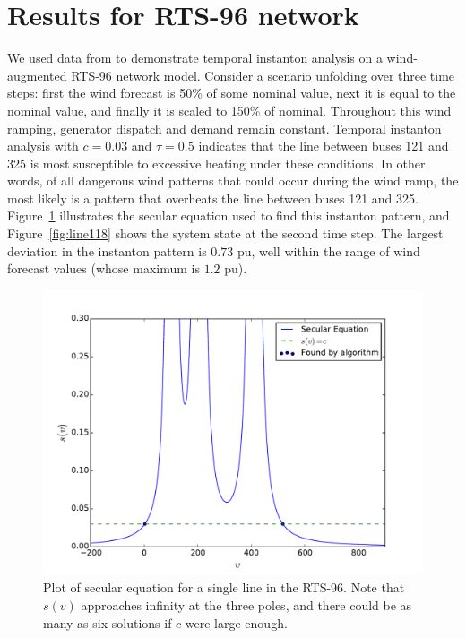 \documentclass[conference]{IEEEtran}
\begin{document}
\section{Results for RTS-96 network}\label{sec:results}

We used data from \cite{pandzic} to demonstrate temporal instanton
analysis on a wind-augmented RTS-96 network model. Consider a scenario
unfolding over three time steps: first the wind forecast is 50\% of
some nominal value, next it is equal to the nominal value, and finally
it is scaled to 150\% of nominal. Throughout this wind ramping,
generator dispatch and demand remain constant. Temporal instanton
analysis with $c=0.03$ and $\tau=0.5$ indicates that the line between
buses 121 and 325 is most susceptible to excessive heating under these
conditions. In other words, of all dangerous wind patterns that could
occur during the wind ramp, the most likely is a pattern that
overheats the line between buses 121 and 325. Figure~\ref{fig:secular}
illustrates the secular equation used to find this instanton pattern,
and Figure~\ref{fig:line118} shows the system state at the second time
step. The largest deviation in the instanton pattern is $0.73$ pu,
well within the range of wind forecast values (whose maximum is $1.2$
pu).


\begin{figure}[t]
\centering
\includegraphics[trim=0in 0in 0.5in 0.5in,clip,width=1\linewidth]{images/secular}
\caption{Plot of secular equation for a single line in the RTS-96. Note that $s(v)$ approaches infinity at the three poles, and there could be as many as six solutions if $c$ were large enough.}	
\label{fig:secular}
\end{figure}
\end{document}
